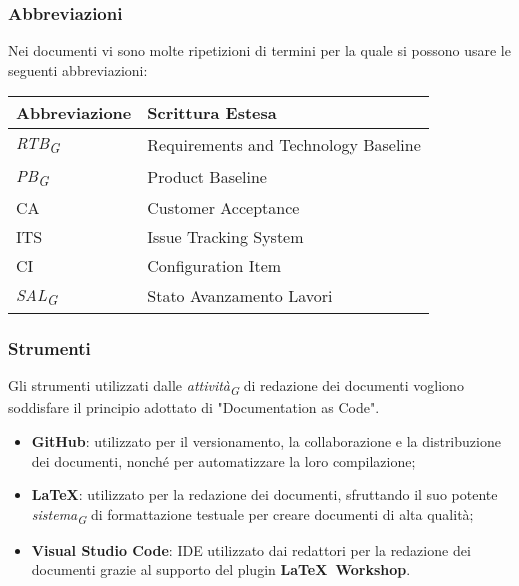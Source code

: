 \subsubsection{Abbreviazioni}
Nei documenti vi sono molte ripetizioni di termini per la quale si possono usare le seguenti abbreviazioni:\\
\vspace{0.2cm}
\begin{center}
    \begin{tabular}{|C{2.5cm}|C{5cm}|}
        \hline
        \textbf{Abbreviazione} & \textbf{Scrittura Estesa}            \\
        \hline
        \textit{RTB}\textsubscript{\textit{G}}                    & Requirements and Technology Baseline \\
        \textit{PB}\textsubscript{\textit{G}}                     & Product Baseline                     \\
        CA                     & Customer Acceptance                  \\
        ITS                    & Issue Tracking System                \\
        CI                     & Configuration Item                   \\
        \textit{SAL}\textsubscript{\textit{G}}                    & Stato Avanzamento Lavori             \\   
        \hline
    \end{tabular}
\end{center}
    
\subsubsection{Strumenti}
Gli strumenti utilizzati dalle \textit{attività}\textsubscript{\textit{G}} di redazione dei documenti vogliono soddisfare il principio adottato di "Documentation as Code".
\begin{itemize}
    \item \textbf{GitHub}: utilizzato per il versionamento, la collaborazione e la distribuzione dei documenti, nonché per automatizzare la loro compilazione;
    \item \textbf{\LaTeX}: utilizzato per la redazione dei documenti, sfruttando il suo potente \textit{sistema}\textsubscript{\textit{G}} di formattazione testuale per creare documenti di alta qualità;
    \item \textbf{Visual Studio Code}: IDE utilizzato dai redattori per la redazione dei documenti grazie al supporto del plugin \textbf{\LaTeX\ Workshop}.
\end{itemize}
